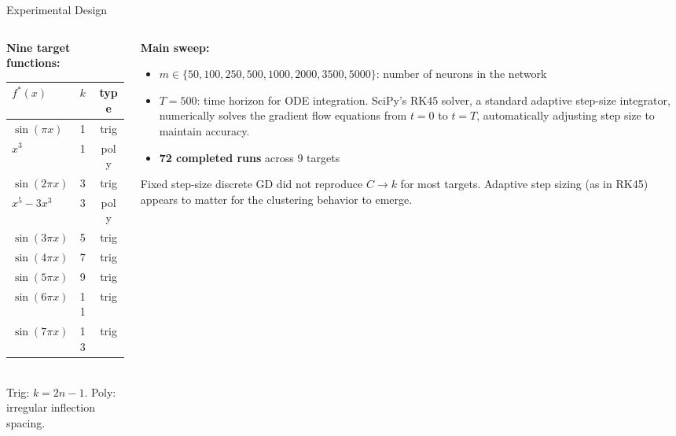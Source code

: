\documentclass[aspectratio=169, 10pt]{beamer}
\newcommand{\fstar}{f^\ast}
\begin{document}
\begin{frame}{Experimental Design}
  \begin{columns}[T]
    \begin{column}{0.40\textwidth}
      \textbf{Nine target functions:}\\[4pt]
      \renewcommand{\arraystretch}{1.1}
      \small
      \begin{tabular}{lcc}
        \toprule
        $\fstar(x)$ & $k$ & type \\
        \midrule
        $\sin(\pi x)$      & 1  & trig \\
        $x^3$              & 1  & poly \\
        $\sin(2\pi x)$     & 3  & trig \\
        $x^5 - 3x^3$       & 3  & poly \\
        $\sin(3\pi x)$     & 5  & trig \\
        $\sin(4\pi x)$     & 7  & trig \\
        $\sin(5\pi x)$     & 9  & trig \\
        $\sin(6\pi x)$     & 11 & trig \\
        $\sin(7\pi x)$     & 13 & trig \\
        \bottomrule
      \end{tabular}\\[4pt]
      \normalsize
      Trig: $k = 2n-1$.\quad
      Poly: irregular inflection spacing.
    \end{column}
    \begin{column}{0.58\textwidth}
      \small
      \textbf{Main sweep:}
      \begin{itemize}
        \item $m \in \{50,100,250,500,1000,2000,3500,5000\}$:
              number of neurons in the network
        \item $T = 500$: time horizon for ODE integration.
              SciPy's RK45 solver, a standard adaptive step-size
              integrator, numerically solves the gradient flow
              equations from $t=0$ to $t=T$, automatically
              adjusting step size to maintain accuracy.
        \item \textbf{72 completed runs} across 9 targets
      \end{itemize}
      \vspace{0.4em}
      \begin{tcolorbox}[slideboxA, title={Discrete GD comparison}]
        \small
        Fixed step-size discrete GD did not reproduce
        $C \to k$ for most targets. Adaptive step sizing
        (as in RK45) appears to matter for the clustering
        behavior to emerge.
      \end{tcolorbox}
    \end{column}
  \end{columns}
\end{frame}
\end{document}
